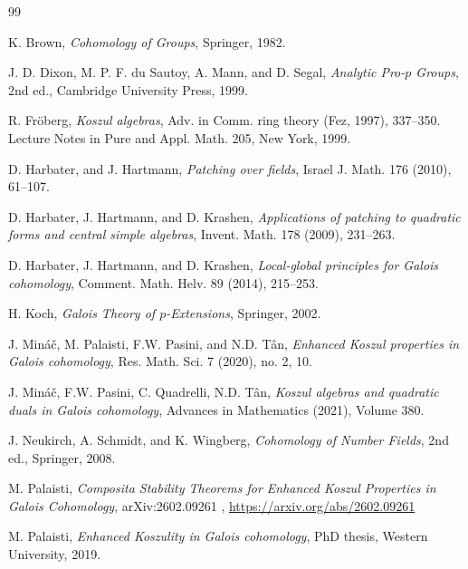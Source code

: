 \documentclass[11pt]{amsart}
\numberwithin{equation}{section}
\theoremstyle{definition}
\begin{document}
	
	\begin{thebibliography}{99}
	
		K. Brown,
		\emph{Cohomology of Groups},
		Springer, 1982.
		
		J. D. Dixon, M. P. F. du Sautoy, A. Mann, and D. Segal,
		\emph{Analytic Pro-$p$ Groups},
		2nd ed., Cambridge University Press, 1999.
		
		R. Fr\"oberg,
		\emph{Koszul algebras},
		Adv. in Comm. ring theory (Fez, 1997), 337--350. Lecture Notes in Pure and Appl. Math. 205, New York, 1999.
		
		
		
		D. Harbater, and J. Hartmann,
		\emph{Patching over fields},
		Israel J. Math. 176 (2010), 61--107.
		
		D. Harbater, J. Hartmann, and D. Krashen,
		\emph{Applications of patching to quadratic forms and central simple algebras},
		Invent. Math. 178 (2009), 231--263.
		
		D. Harbater, J. Hartmann, and D. Krashen,
		\emph{Local-global principles for Galois cohomology},
		Comment. Math. Helv. 89 (2014), 215--253.
		
		H. Koch,
		\emph{Galois Theory of $p$-Extensions},
		Springer, 2002.
		
		
		J. Min\'a\v{c}, M. Palaisti, F.W. Pasini, and N.D. T\^{a}n,
		\emph{Enhanced Koszul properties in Galois cohomology},
		Res. Math. Sci. 7 (2020), no. 2, 10.
		
		J. Min\'a\v{c}, F.W. Pasini, C. Quadrelli, N.D. T\^{a}n,
		\emph{Koszul algebras and quadratic duals in Galois cohomology},
		Advances in Mathematics (2021), Volume 380.
		
		
		
		J. Neukirch, A. Schmidt, and K. Wingberg,
		\emph{Cohomology of Number Fields},
		2nd ed., Springer, 2008.
		
		
		M. Palaisti,
		\emph{Composita Stability Theorems for Enhanced Koszul Properties in Galois Cohomology},
		arXiv:2602.09261 , \url{https://arxiv.org/abs/2602.09261}
		
		
		M. Palaisti,
		\emph{Enhanced Koszulity in Galois cohomology},
		PhD thesis, Western University, 2019.
		

\end{thebibliography}
\end{document}
